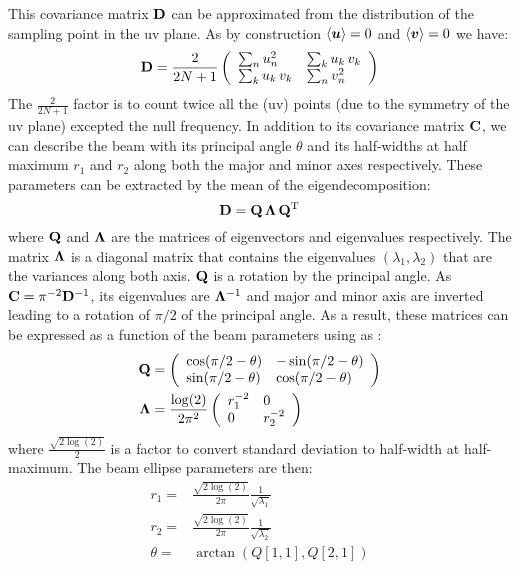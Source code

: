 \documentclass[a4paper,11pt,twoside]{scrartcl}
\begin{document}
This covariance matrix $\mathbf{D}$  can be approximated from the distribution of  the sampling point in the uv plane. As by construction $\left\langle \boldsymbol{u}\right\rangle = 0 $ and $\left\langle \boldsymbol{v}\right\rangle = 0$ we have:
\begin{equation}
	\mathbf{D} = \frac{2}{2N+1}\left(
		\begin{array}{ll}
			 \sum_n u_n^2 	 &  \sum_k u_k \,v_k\\
			 \sum_k u_k \,v_k &  \sum_n v_n^2
		\end{array}
	\right)
\end{equation}
The $ \frac{2}{2N+1}$ factor is to  count twice all the (uv) points (due to the  symmetry of the uv plane) excepted the null frequency. 
In addition to its covariance matrix $\mathbf{C}$, we can describe the beam with its principal angle $\theta$ and its half-widths at half maximum  $r_1$  and  $r_2$ along both the major and minor axes respectively.   These parameters can be extracted by the mean of the eigendecomposition:
\begin{equation}
	\mathbf{D} = \mathbf{Q} \, \mathbf{\Lambda} \, \mathbf{Q}^{\mathrm{T}}
\end{equation}
where $\mathbf{Q}$ and $\mathbf{\Lambda}$ are the matrices of eigenvectors and eigenvalues respectively. The matrix $\mathbf{\Lambda}$ is a diagonal matrix that contains the eigenvalues $(\lambda_1,\lambda_2)$ that are the variances along both axis. $\mathbf{Q}$ is a rotation  by the principal angle. As  $\mathbf{C} = \pi^{-2}\mathbf{D}^{-1}$, its eigenvalues are $ \mathbf{\Lambda}^{-1}$ and major and minor axis are inverted leading to a rotation of $\pi/2$ of the principal angle. As a result, these matrices can be expressed as a function of the beam parameters using as :
\begin{align}
	\mathbf{Q} &= \left(
		\begin{array}{ll}
			\cos(\pi/2 - \theta) & -\sin(\pi/2 - \theta) \\
			\sin(\pi/2 - \theta) & \cos(\pi/2 - \theta)  
		\end{array}
		\right)\\
	\mathbf{\Lambda} &=  \frac{\log(2)}{2\pi^2} \left(
		\begin{array}{ll}
		r_1^{-2}	&  0\\
		0 			&  r_2^{-2}
		\end{array}
		\right)\\
\end{align}
where $\frac{\sqrt{2\log(2)}}{2}$ is a factor to convert standard deviation to half-width at half-maximum.
The beam ellipse parameters are then:
\begin{align}
	r_1 = & \frac{\sqrt{2\log(2)}}{2\pi} \frac{1}{\sqrt{\lambda_1}}\\
	r_2 = & \frac{\sqrt{2\log(2)}}{2\pi}  \frac{1}{\sqrt{\lambda_2}}\\
	\theta = & \arctan\left(Q[1,1], Q[2,1]\right)
\end{align}
\end{document}

